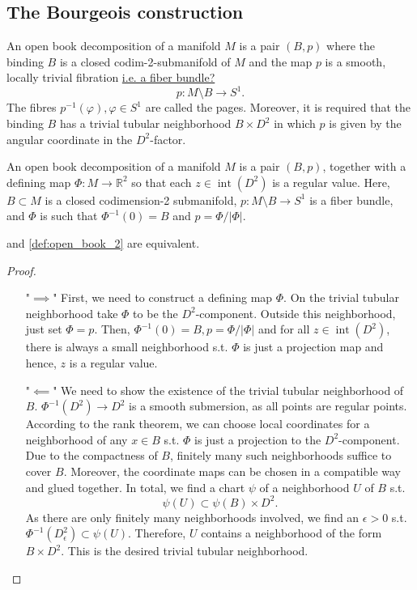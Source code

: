 \subsection*{The Bourgeois construction}

\begin{definition}\label{def:open_book_1}
    An open book decomposition of a manifold $M$ is a pair $(B,p)$ where the binding $B$ is a closed codim-2-submanifold of $M$ and the map $p$ is a smooth, locally trivial fibration \underline{i.e. a fiber bundle?}
    \[
        p: M\setminus B \to S^1.
    \]
    The fibres $p^{-1}(\varphi), \varphi \in S^1$ are called the pages.
    Moreover, it is required that the binding $B$ has a trivial tubular neighborhood $B\times D^2$ in which $p$ is given by the angular coordinate in the $D^2$-factor.
\end{definition}

\begin{definition}\label{def:open_book_2}
    An open book decomposition of a manifold $M$ is a pair $(B, p)$, together with a defining map $\Phi:M \to \mathbb R^2$ so that each $z \in \operatorname{int}(D^2)$ is a regular value.
    Here, $B \subset M$ is a closed codimension-2 submanifold, $p: M\setminus B \to S^1$ is a fiber bundle, and $\Phi$ is such that $\Phi^{-1}(0) = B$ and $p =  \Phi / |\Phi|$.
\end{definition}

\begin{lemma}
     and \cref{def:open_book_2} are equivalent.
\end{lemma}
\begin{proof}
\ 
    \begin{itemize}
        \item["$\implies$"] First, we need to construct a defining map $\Phi$. On the trivial tubular neighborhood take $\Phi$ to be the $D^2$-component. Outside this neighborhood, just set $\Phi = p$.
        Then, $\Phi^{-1}(0) = B, p = \Phi/|\Phi|$ and for all $z \in \operatorname{int}(D^2)$, there is always a small neighborhood s.t. $\Phi$ is just a projection map and hence, $z$ is a regular value.
        \item["$\impliedby$"] We need to show the existence of the trivial tubular neighborhood of $B$.
        $\Phi^{-1}(D^2) \to D^2$ is a smooth submersion, as all points are regular points. 
        According to the rank theorem, we can choose local coordinates for a neighborhood of any $x \in B$ s.t. $\Phi$  is just a projection to the $D^2$-component. Due to the compactness of $B$, finitely many such neighborhoods suffice to cover $B$.
        Moreover, the coordinate maps can be chosen in a compatible way and glued together.
        In total, we find a chart $\psi$ of a neighborhood $U$ of $B$ s.t.
        \[
            \psi(U) \subset \psi(B) \times D^2.
        \]
        As there are only finitely many neighborhoods involved, we find an $\epsilon > 0$ s.t. $\Phi^{-1}(D_\epsilon^2) \subset \psi(U)$.
        Therefore, $U$ contains a neighborhood of the form $B \times D^2$.
        This is the desired trivial tubular neighborhood.
    \end{itemize}
\end{proof}

